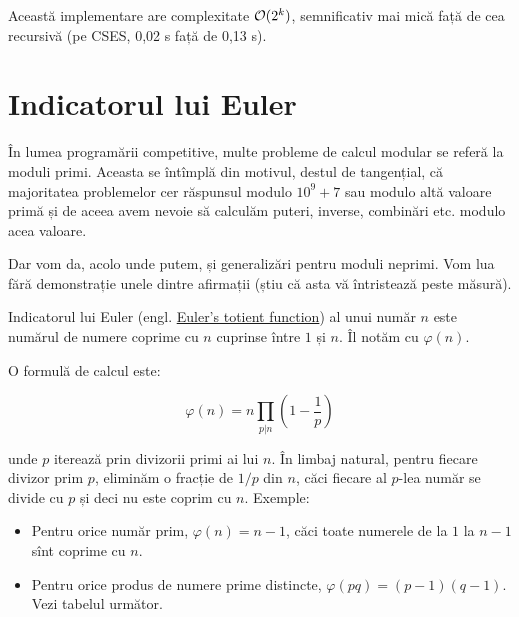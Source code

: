 \documentclass[../main.tex]{subfiles}
\begin{document}
Această implementare are complexitate $\mathcal{O}(2^k)$, semnificativ mai mică față de cea recursivă (pe CSES, 0,02 s față de 0,13 s).


\section{Indicatorul lui Euler}

În lumea programării competitive, multe probleme de calcul modular se referă la moduli primi. Aceasta se întîmplă din motivul, destul de tangențial, că majoritatea problemelor cer răspunsul modulo $10^9 + 7$ sau modulo altă valoare primă și de aceea avem nevoie să calculăm puteri, inverse, combinări etc. modulo acea valoare.

Dar vom da, acolo unde putem, și generalizări pentru moduli neprimi. Vom lua fără demonstrație unele dintre afirmații (știu că asta vă întristează peste măsură).

\begin{definition}
Indicatorul lui Euler (engl. \href{https://en.wikipedia.org/wiki/Euler\%27s_totient_function}{Euler's totient function}) al unui număr $n$ este numărul de numere coprime cu $n$ cuprinse între $1$ și $n$. Îl notăm cu $\varphi(n)$.
\end{definition}

O formulă de calcul este:

$$\varphi(n) = n \prod_{p|n} \left(1 - \frac{1}{p}\right)$$

unde $p$ iterează prin divizorii primi ai lui $n$. În limbaj natural, pentru fiecare divizor prim $p$, eliminăm o fracție de $1/p$ din $n$, căci fiecare al $p$-lea număr se divide cu $p$ și deci nu este coprim cu $n$. Exemple:

\begin{itemize}
  \item Pentru orice număr prim, $\varphi(n) = n-1$, căci toate numerele de la $1$ la $n-1$ sînt coprime cu $n$.

  \item Pentru orice produs de numere prime distincte, $\varphi(pq) = (p-1)(q-1)$. Vezi tabelul următor.
\end{itemize}
\end{document}
